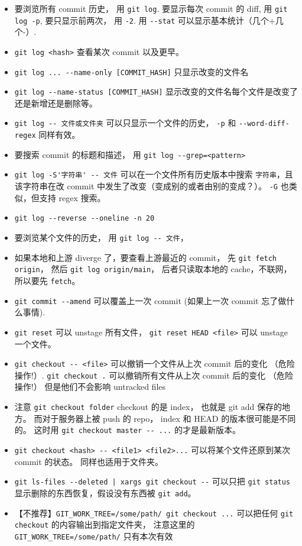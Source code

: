 \begin{itemize}
\item 要浏览所有 commit 历史， 用 \verb`git log`. 要显示每次 commit 的 diff, 用 \verb`git log -p`, 要只显示前两次， 用 \verb`-2`. 用 \verb`--stat` 可以显示基本统计（几个+几个-）.
\item \verb`git log <hash>` 查看某次 commit 以及更早。
\item \verb`git log ... --name-only [COMMIT_HASH]` 只显示改变的文件名
\item \verb`git log --name-status [COMMIT_HASH]` 显示改变的文件名每个文件是改变了还是新增还是删除等。
\item \verb`git log -- 文件或文件夹` 可以只显示一个文件的历史， \verb`-p` 和 \verb`--word-diff-regex` 同样有效。
\item 要搜索 commit 的标题和描述， 用 \verb`git log --grep=<pattern>`
\item \verb`git log -S'字符串' -- 文件` 可以在一个文件所有历史版本中搜索 \verb`字符串`，且该字符串在改 commit 中发生了改变（变成别的或者由别的变成？）。 \verb`-G` 也类似，但支持 regex 搜索。
\item \verb`git log --reverse --oneline -n 20`
\item 要浏览某个文件的历史， 用 \verb`git log -- 文件`， 
\item 如果本地和上游 diverge 了，要查看上游最近的 commit， 先 \verb`git fetch origin`， 然后 \verb`git log origin/main`， 后者只读取本地的 cache，不联网，所以要先 \verb`fetch`。
\item \verb`git commit --amend` 可以覆盖上一次 commit (如果上一次 commit 忘了做什么事情).
\item \verb`git reset` 可以 unstage 所有文件， \verb`git reset HEAD <file>` 可以 unstage 一个文件。
\item \verb`git checkout -- <file>` 可以撤销一个文件从上次 commit 后的变化 （危险操作!）. \verb`git checkout .` 可以撤销所有文件从上次 commit 后的变化 （危险操作!） 但是他们不会影响 untracked files
\item 注意 \verb`git checkout folder` checkout 的是 index， 也就是 git add 保存的地方。 而对于服务器上被 push 的 repo， index 和 HEAD 的版本很可能是不同的。 这时用 \verb`git checkout master -- ...` 的才是最新版本。
\item \verb`git checkout <hash> -- <file1> <file2>...` 可以将某个文件还原到某次 commit 的状态。 同样也适用于文件夹。
\item \verb`git ls-files --deleted | xargs git checkout --` 可以只把 \verb`git status` 显示删除的东西恢复，假设没有东西被 \verb`git add`。
\item 【不推荐】\verb`GIT_WORK_TREE=/some/path/ git checkout ...` 可以把任何 \verb`git checkout` 的内容输出到指定文件夹， 注意这里的 \verb`GIT_WORK_TREE=/some/path/` 只有本次有效

\end{itemize}
